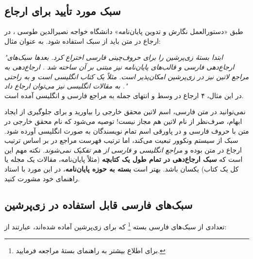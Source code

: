 \subsection{سبک مورد تأیید برای ارجاع}
طبق «دستورالعمل نگارش و تدوین پایان‌نامه» دانشگاه خواجه نصیرالدین طوسی 
\cite{KNTUThesisGuide}،
در ارجاع در متن باید از سبک 
استفاده شود.
به عنوان مثال:

\textit{
"ابتدا
\cite{Khalighi87xepersian}
بستهٔ زی‌پرشین را برای حروف‌چینی فارسی اختراع کرد. بعدها سبک‌های ارجاع‌دهی فارسی و قالب‌های پایان‌نامه نیز مبتنی بر آن ساخته شد
\citep{persianbib87userguide}.
ارجاع‌دهی به مراجع لاتین نیز در زی‌پرشین امکان‌پذیر است. مثلاً
یک کتاب انگلیسی است و به راحتی به مقالات انگلیسی نیز می‌توان ارجاع داد
."}\\
در این مثال، ۴ ارجاع در وسط و انتهای جمله به مراجع فارسی و انگلیسی آمده است.

نمی‌توانید در متن فارسی، اسم لاتین محقق خارجی را بیاورید و برای جلوگیری از ایجاد ابهام، صرف‌نظر از نام لاتین هم مجاز نیست! توصیه می‌شود که نام محقق خارجی در متن با حروف فارسی و در پاورقی اسم تمام نویسندگان به صورت انگلیسی آورده شود. 
سبک 
از سیستم ونکوور تبعیت می‌کند، اما ترتیب فهرست مراجع در
بر اساس ترتیب ارجاع در متن بوده و
\emph{مراجع انگلیسی و فارسی از هم تفکیک نمی‌شوند.}
نکته مهم این است که
\textbf{سبک ارجاع‌دهی در تمام طول یک کتابچه}
(مثلاً پایان‌نامه، مقالات یک مجله یا کل یک کتاب) یکسان باشد. بهتر است
\textbf{بسته به حوزه پایان‌نامه}،
در این مورد با استاد راهنمای خود مشورت کنید.

\subsection{سبک‌های فارسی قابل استفاده در زی‌پرشین}
تعدادی از سبک‌های فارسی بسته
%
\footnote{ برای اطلاع بیشتر به راهنمای بستهٔ
مراجعه فرمایید.}
که برای  زی‌پرشین آماده شده‌اند، عبارتند از:

